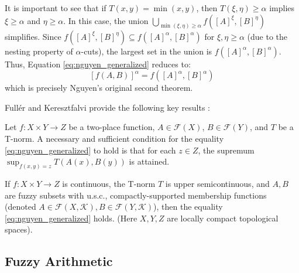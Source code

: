 It is important to see that if $T(x,y) = \min(x,y)$, then $T(\xi, \eta) \ge \alpha$ implies $\xi \ge \alpha$ and $\eta \ge \alpha$. In this case, the union $\bigcup_{\min(\xi, \eta) \ge \alpha} f([A]^\xi, [B]^\eta)$ simplifies. Since $f([A]^\xi, [B]^\eta) \subseteq f([A]^\alpha, [B]^\alpha)$ for $\xi, \eta \ge \alpha$ (due to the nesting property of $\alpha$-cuts), the largest set in the union is $f([A]^\alpha, [B]^\alpha)$. Thus, Equation \eqref{eq:nguyen_generalized} reduces to:
\[
[f(A, B)]^\alpha = f([A]^\alpha, [B]^\alpha)
\]
which is precisely Nguyen's original second theorem.

Fullér and Keresztfalvi provide the following key results \cite[Thms. 1.9.1, 1.9.2]{FULLER2}:
\begin{theorem}
    Let $f: X \times Y \to Z$ be a two-place function, $A \in \mathcal{F}(X)$, $B \in \mathcal{F}(Y)$, and $T$ be a T-norm. A necessary and sufficient condition for the equality \eqref{eq:nguyen_generalized} to hold is that for each $z \in Z$, the supremum $\sup_{f(x,y)=z} T(A(x), B(y))$ is attained.
\end{theorem}

\begin{theorem}
    If $f: X \times Y \to Z$ is continuous, the T-norm $T$ is upper semicontinuous, and $A, B$ are fuzzy subsets with u.s.c., compactly-supported membership functions (denoted $A \in \mathcal{F}(X, \mathcal{K}), B \in \mathcal{F}(Y, \mathcal{K})$), then the equality \eqref{eq:nguyen_generalized} holds.
    (Here $X, Y, Z$ are locally compact topological spaces).
\end{theorem}












\subsection{Fuzzy Arithmetic}
\label{sec:fuzzy_arithmetic}

